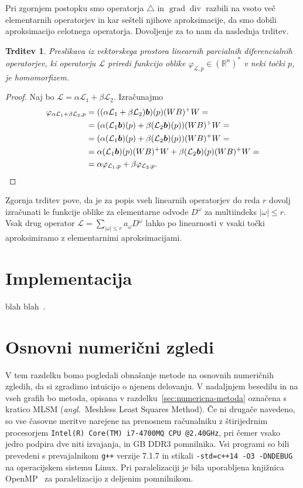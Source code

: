 \documentclass[12pt,a4paper,twoside]{article}
\theoremstyle{definition} %
\theoremstyle{plain} %
\newtheorem{trditev}[definicija]{Trditev}
\numberwithin{equation}{section}
\newcommand{\R}{\mathbb R}
\renewcommand{\L}{\mathcal{L}}
\newcommand{\lap}{\triangle}
\renewcommand{\div}{\operatorname{div}}
\newcommand{\grad}{\operatorname{grad}}
\renewcommand{\b}{\boldsymbol}
\renewcommand{\phi}{\varphi}
\newcommand{\ang}[1]{(\textit{angl.}\ #1)}
\begin{document}
Pri zgornjem postopku smo operatorja $\lap$ in $\grad \div$ razbili na vsoto več elementarnih
operatorjev in kar sešteli njihove aproksimacije, da smo dobili aproksimacijo celotnega operatorja.
Dovoljenje za to nam da naslednja trditev.

\begin{trditev}
  Preslikava iz vektorskega prostora linearnih parcialnih diferencialnih operatorjev, ki operatorju
  $\L$ priredi funkcijo oblike $\phi_{\L,p} \in (\R^n)^\ast$ v neki točki $p$, je homomorfizem.
\end{trditev}
\begin{proof}
Naj bo $\L = \alpha \L_1 + \beta \L_2$. Izračunajmo
  \begin{align*}
    \phi_{\alpha \L_1 + \beta \L_2,p} &=
    ((\alpha \L_1 + \beta \L_2)\b b)(p)(WB)^+W = \\
    &= (\alpha (\L_1\b b)(p) + \beta (\L_2\b b)(p))(WB)^+W = \\
    &= (\alpha (\L_1\b b)(p) + \beta (\L_2\b b)(p))(WB)^+W =\\
  &= \alpha (\L_1\b b)(p)(WB)^+W + \beta (\L_2\b b)(p)(WB)^+W = \\
  &= \alpha \phi_{\L_1,p} + \beta \phi_{\L_2,p}. \qedhere
  \end{align*}
\end{proof}
Zgornja trditev pove, da je za popis vseh linearnih operatorjev do reda $r$ dovolj
izračunati le funkcije oblike za elementarne odvode $D^\omega$ za multiindeks $|\omega| \leq r$.
Vsak drug operator $\L = \sum_{|\omega| \leq r} a_\omega D^\omega$ lahko po linearnosti
v vsaki točki aproksimiramo z elementarnimi aproksimacijami.

\section{Implementacija}
\label{sec:implementacija}
blah blah~\cite{stroustrup1995c++}.

\section{Osnovni numerični zgledi}
\label{sec:osnovni-zgledi}
V tem razdelku bomo pogledali obnašanje metode na osnovnih numeričnih zgledih, da si zgradimo
intuicijo o njenem delovanju. V nadaljnjem besedilu in na vseh grafih bo metoda, opisana v
razdelku~\ref{sec:numericna-metoda} označena s kratico MLSM \ang{Meshless Least Squares Method}.  Če
ni drugače navedeno, so vse časovne meritve narejene na prenosnem računalniku z štirijedrnim
procesorjem \verb|Intel(R) Core(TM) i7-4700MQ CPU @2.40GHz|, pri čemer vsako jedro podpira dve niti
izvajanja, in \unit[16]{GB} DDR3 pomnilnika. Vsi programi so bili prevedeni s prevajalnikom
\verb|g++| verzije 7.1.7 in stikali \verb|-std=c++14 -O3 -DNDEBUG| na operacijskem sistemu Linux.
Pri paralelizaciji je bila uporabljena knjižnica OpenMP~\cite{dagum1998openmp} za paralelizacijo z
deljenim pomnilnikom.
\end{document}
